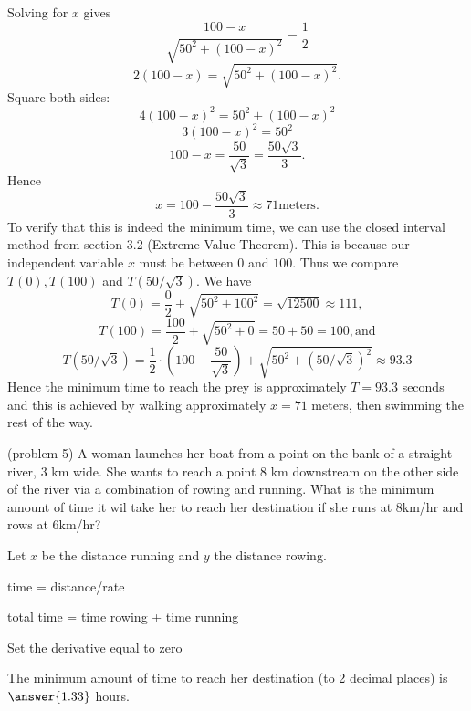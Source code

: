 \documentclass{ximera}
\begin{document}
\begin{example}[example 5]
Solving for $x$ gives
\[
\frac{100 - x}{\sqrt{50^2 + (100-x)^2}} = \frac12
\]
\[
2(100 - x) = \sqrt{50^2 + (100-x)^2}.
\]
Square both sides:
\[
4(100-x)^2 = 50^2 + (100-x)^2
\]
\[
3(100-x)^2 = 50^2
\]
\[
100-x = \frac{50}{\sqrt{3}} = \frac{50\sqrt{3}}{3}.
\]
Hence
\[
x = 100 - \frac{50\sqrt{3}}{3} \approx 71 \text{meters}.
\]
To verify that this is indeed the minimum time, we can use the closed interval method from section 3.2 (Extreme Value Theorem).
This is because our independent variable $x$ must be between $0$ and $100$. Thus we compare $T(0), T(100)$ and $T(50/\sqrt 3)$.
We have 
\[
T(0) = \frac02 +  \sqrt{50^2 + 100^2} = \sqrt{12500} \approx 111,
\]
\[
T(100) = \frac{100}{2} +  \sqrt{50^2 + 0} = 50 + 50 = 100, \text{and}
\]
\[
T(50/\sqrt 3) = \frac12 \cdot \left(100- \frac{50}{\sqrt 3}\right) +  \sqrt{50^2 + (50/\sqrt 3)^2} \approx 93.3
\]
Hence the minimum time to reach the prey is approximately $T=93.3$ seconds and this is achieved by walking approximately $x =71$ meters, 
then swimming the rest of the way.
\end{example}


\begin{problem}(problem 5)
A woman launches her boat from a point on the bank of a straight river, 3 km wide. 
She wants to reach a point 8 km downstream on the other side of the river via a combination of rowing and running.
What is the minimum amount of time it wil take her to reach her destination if she runs at 8km/hr and rows at 6km/hr?


\begin{hint}
Let $x$ be the distance running and $y$ the distance rowing.
\end{hint}
\begin{hint}
time = distance/rate
\end{hint}
\begin{hint}
total time = time rowing + time running
\end{hint}
\begin{hint}
Set the derivative equal to zero
\end{hint}

The minimum amount of time to reach her destination (to 2 decimal places) is $\answer{1.33}$ hours.
\end{problem}
\end{document}

